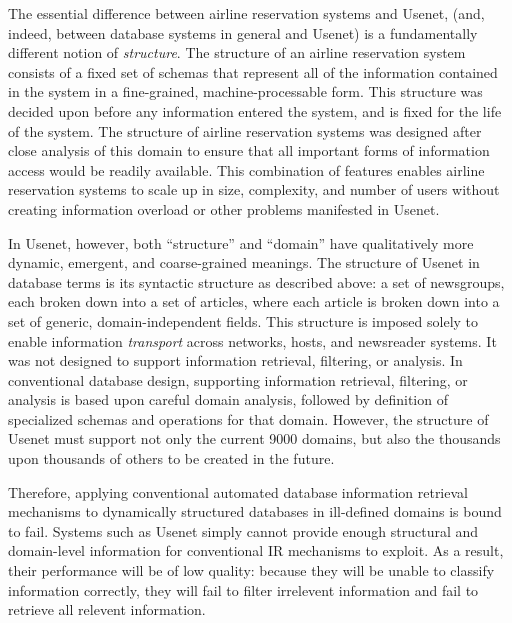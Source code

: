 
The essential difference between airline reservation systems and Usenet, (and,
indeed, between database systems in general and Usenet) is a fundamentally
different notion of {\em structure}.  The structure of an airline reservation
system consists of a fixed set of schemas that represent all of the information
contained in the system in a fine-grained, machine-processable form.  This
structure was decided upon before any information entered the system, and is
fixed for the life of the system.  The structure of airline reservation systems
was designed after close analysis of this domain to ensure that all important
forms of information access would be readily available.  This combination of
features enables airline reservation systems to scale up in size, complexity,
and number of users without creating information overload or other problems
manifested in Usenet.

In Usenet, however, both ``structure'' and ``domain'' have qualitatively
more dynamic, emergent, and coarse-grained meanings.  The structure of
Usenet in database terms is its syntactic structure as described above: a
set of newsgroups, each broken down into a set of articles, where each
article is broken down into a set of generic, domain-independent fields.
This structure is imposed solely to enable information {\em transport}
across networks, hosts, and newsreader systems.  It was not designed to
support information retrieval, filtering, or analysis.  In conventional
database design, supporting information retrieval, filtering, or analysis
is based upon careful domain analysis, followed by definition of
specialized schemas and operations for that domain.  However, the structure
of Usenet must support not only the current 9000 domains, but also the
thousands upon thousands of others to be created in the future. 

Therefore, applying conventional automated database information retrieval
mechanisms to dynamically structured databases in ill-defined domains is
bound to fail.  Systems such as Usenet simply cannot provide enough
structural and domain-level information for conventional IR mechanisms to
exploit. As a result, their performance will be of low quality: because
they will be unable to classify information correctly, they will fail to
filter irrelevent information and fail to retrieve all relevent
information.

